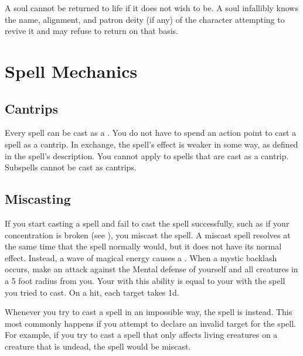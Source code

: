          A soul cannot be returned to life if it does not wish to be.
        A soul infallibly knows the name, alignment, and patron deity (if any) of the character attempting to revive it and may refuse to return on that basis.

\section{Spell Mechanics}\label{Spell Mechanics}

    \subsection{Cantrips}\label{Cantrips}
        Every spell can be cast as a .
        You do not have to spend an action point to cast a spell as a cantrip.
        In exchange, the spell's effect is weaker in some way, as defined in the spell's description.
        You cannot apply  to spells that are cast as a cantrip.
        Subspells cannot be cast as cantrips.

    \subsection{Miscasting}\label{Miscasting}

        If you start casting a spell and fail to cast the spell successfully, such as if your concentration is broken (see ), you miscast the spell.
        A miscast spell resolves at the same time that the spell normally would, but it does not have its normal effect.
        Instead, a wave of magical energy causes a .
        When a mystic backlash occurs, make an attack against the Mental defense of yourself and all creatures in a 5 foot radius from you.
        Your  with this ability is equal to your  with the spell you tried to cast.
        On a hit, each target takes  \minus1d.

         Whenever you try to cast a spell in an impossible way, the spell is  instead.
        This most commonly happens if you attempt to declare an invalid target for the spell.
        For example, if you try to cast a spell that only affects living creatures on a creature that is undead, the spell would be miscast.

